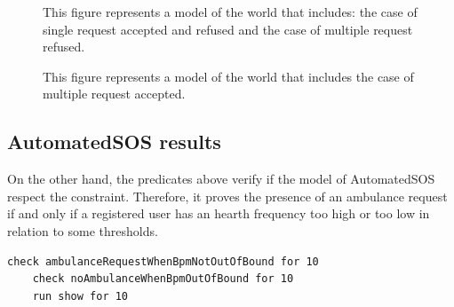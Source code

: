    \begin{figure}[H]
        \centering
        \caption{ This figure represents a model of the world that includes: the case of single request accepted and refused and the case of multiple request refused. }
        \label{ fig:D4H-single-model }
    \end{figure}
    
    \begin{figure}[H]
        \centering
        \caption{ This figure represents a model of the world that includes the case of multiple request accepted.}
        \label{ fig:D4H-multiple-model }
    \end{figure}

    \subsection{AutomatedSOS results}
    On the other hand, the predicates above verify if the model of AutomatedSOS respect the constraint. Therefore, it proves the presence of an ambulance request if and only if a registered user has an hearth frequency too high or too low in relation to some thresholds.\\
    
\begin{lstlisting}[language=alloy]
    check ambulanceRequestWhenBpmNotOutOfBound for 10
    check noAmbulanceWhenBpmOutOfBound for 10
    run show for 10
\end{lstlisting}


